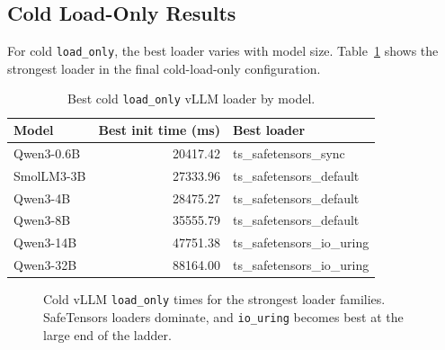 \subsection{Cold Load-Only Results}

For cold \texttt{load\_only}, the best loader varies with model size. Table~\ref{tab:vllm-load-only} shows the strongest loader in the final cold-load-only configuration.

\begin{table}[h]
\caption{Best cold \texttt{load\_only} vLLM loader by model.}
\label{tab:vllm-load-only}
\centering
\begin{tabular}{lrl}
\toprule
Model & Best init time (ms) & Best loader \\
\midrule
Qwen3-0.6B & 20417.42 & ts\_safetensors\_sync \\
SmolLM3-3B & 27333.96 & ts\_safetensors\_default \\
Qwen3-4B & 28475.27 & ts\_safetensors\_default \\
Qwen3-8B & 35555.79 & ts\_safetensors\_default \\
Qwen3-14B & 47751.38 & ts\_safetensors\_io\_uring \\
Qwen3-32B & 88164.00 & ts\_safetensors\_io\_uring \\
\bottomrule
\end{tabular}
\end{table}

\begin{figure}[h]
\centering
{}
\caption{Cold vLLM \texttt{load\_only} times for the strongest loader families. SafeTensors loaders dominate, and \texttt{io\_uring} becomes best at the large end of the ladder.}
\label{fig:vllm-load-only}
\end{figure}

